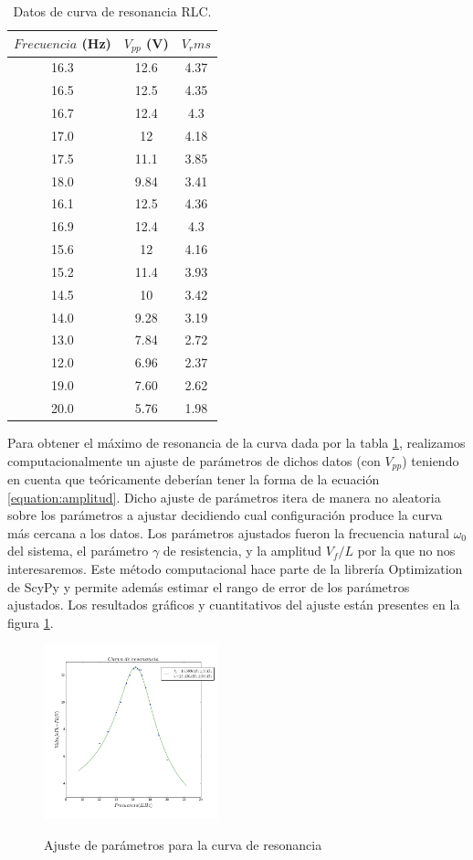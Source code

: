 \documentclass[%
 reprint,
 amsmath,amssymb,
 aps,
]{revtex4-1}
\begin{document}
\begin{table}[h!]
\centering
 \begin{tabular}{|c|c|c|} 
 \hline
 $Frecuencia$ (Hz) & $V_{pp}$ (V) & $V_rms$ \\ [0.5ex] 
 \hline\hline
16.3 &		12.6 &		4.37\\
16.5 &		12.5 &		4.35\\
16.7 &		12.4 &		4.3\\
17.0 &		12 &		4.18\\
17.5 &		11.1 &		3.85\\
18.0 &		9.84 &		3.41\\
16.1 &		12.5 &		4.36\\
16.9 &		12.4 &		4.3\\
15.6 &		12 &		4.16\\
15.2 &		11.4 &		3.93\\
14.5 &		10 &		3.42\\
14.0 &		9.28 &		3.19\\
13.0 &		7.84 &		2.72\\
12.0 &		6.96 &		2.37\\
19.0 &		7.60 &		2.62\\
20.0 &		5.76 &		1.98\\
[1ex] 
 \hline
 \end{tabular}
 \caption{Datos de curva de resonancia RLC.}
 \label{table:resonancia}
\end{table}

Para obtener el máximo de resonancia de la curva dada por la tabla \ref{table:resonancia}, realizamos computacionalmente un ajuste de parámetros de dichos datos (con $V_{pp}$) teniendo en cuenta que te\'oricamente deber\'ian tener la forma de la ecuaci\'on \ref{equation:amplitud}. Dicho ajuste de parámetros itera de manera no aleatoria sobre los par\'ametros a ajustar decidiendo cual configuraci\'on produce la curva m\'as cercana a los datos. Los par\'ametros ajustados fueron la frecuencia natural $\omega_0$ del sistema, el par\'ametro $\gamma$ de resistencia, y la amplitud $V_f/L$ por la que no nos interesaremos. Este m\'etodo computacional hace parte de la librer\'ia Optimization de ScyPy y permite adem\'as estimar el rango de error de los par\'ametros ajustados. Los resultados gr\'aficos y cuantitativos del ajuste est\'an presentes en la figura \ref{fig:resonancia}.\\

\begin{figure}[h]
\caption{Ajuste de parámetros para la curva de resonancia}
\centering
\includegraphics[width=0.45\textwidth]{resonancia}
\label{fig:resonancia}
\end{figure}
\end{document}
